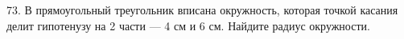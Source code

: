 73. В прямоугольный треугольник вписана окружность, которая точкой касания делит гипотенузу на 2 части --- 4 см и 6 см. Найдите радиус окружности.\\
